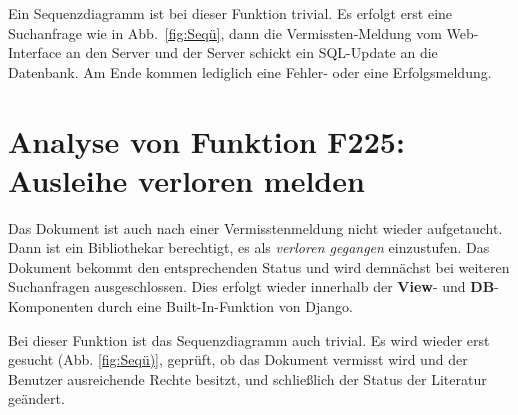 Ein Sequenzdiagramm ist bei dieser Funktion trivial. Es erfolgt erst eine Suchanfrage wie in Abb.\ \ref{fig:Seqü}, dann die Vermissten-Meldung vom Web-Interface an den Server und der Server schickt ein SQL-Update an die Datenbank. Am Ende kommen lediglich eine Fehler- oder eine Erfolgsmeldung.

\section{Analyse von Funktion F225: Ausleihe verloren melden}
\label{f:225}
Das Dokument ist auch nach einer Vermisstenmeldung nicht wieder aufgetaucht. Dann ist ein Bibliothekar berechtigt, es als \emph{verloren gegangen} einzustufen. Das Dokument bekommt den entsprechenden Status und wird demnächst bei weiteren Suchanfragen ausgeschlossen. Dies erfolgt wieder innerhalb der \textbf{View}- und \textbf{DB}-Komponenten durch eine Built-In-Funktion von Django.

Bei dieser Funktion ist das Sequenzdiagramm auch trivial. Es wird wieder erst gesucht (Abb. \ref{fig:Seqü)}, geprüft, ob das Dokument vermisst wird und der Benutzer ausreichende Rechte besitzt, und schließlich der Status der Literatur geändert. 